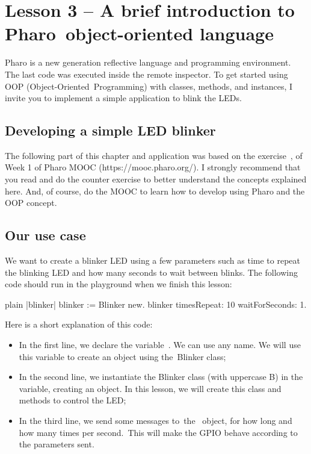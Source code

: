 \documentclass[10pt,twoside,english]{_support/latex/sbabook/sbabook}
\begin{document}
\frontmatter
\pagestyle{plain}

\tableofcontents*
\clearpage\listoffigures

\mainmatter

\chapter{Lesson 3 – A brief introduction to Pharo object-oriented language}
Pharo is a new generation reflective language and programming environment. The last code was executed inside the remote inspector. To get started using OOP (Object-Oriented Programming) with classes, methods, and instances, I invite you to implement a simple application to blink the LEDs.
\section{Developing a simple LED blinker}
The following part of this chapter and application was based on the exercise , of Week 1 of Pharo MOOC (https://mooc.pharo.org/). I strongly recommend that you read and do the counter exercise to better understand the concepts explained here. And, of course, do the MOOC to learn how to develop using Pharo and the OOP concept.
\section{Our use case}
We want to create a blinker LED using a few parameters such as time to repeat the blinking LED and how many seconds to wait between blinks. The following code should run in the playground when we finish this lesson:

\begin{displaycode}{plain}
|blinker|
blinker := Blinker new.
blinker timesRepeat: 10 waitForSeconds: 1.
\end{displaycode}

Here is a short explanation of this code:

\begin{itemize}
\item In the first line, we declare the variable . We can use any name. We will use this variable to create an object using the Blinker class;
\item In the second line, we instantiate the Blinker class (with uppercase B) in the  variable, creating an object. In this lesson, we will create this class and methods to control the LED;
\item In the third line, we send some messages to the  object, for how long and how many times per second. This will make the GPIO behave according to the parameters sent.
\end{itemize}
\end{document}
